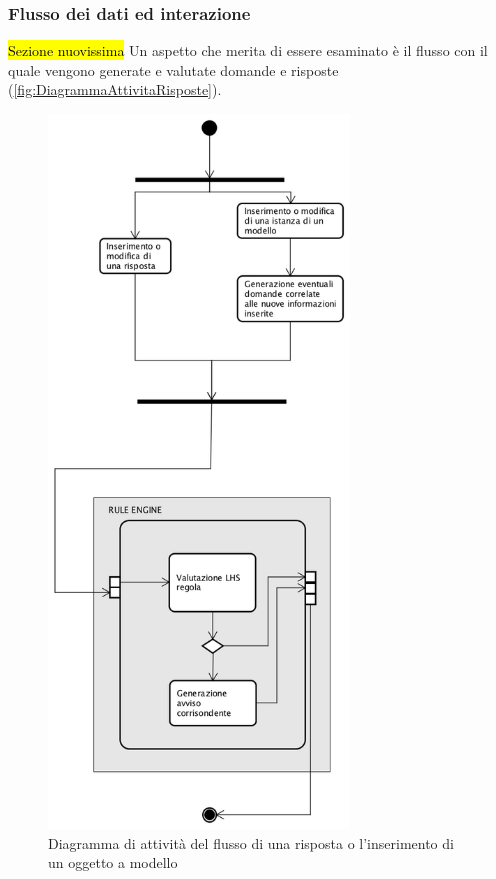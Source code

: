 \subsubsection{Flusso dei dati ed interazione}
\hl{Sezione nuovissima}
 Un aspetto che merita di essere esaminato è il flusso con il quale vengono generate e valutate domande e risposte  (\autoref{fig:DiagrammaAttivitaRisposte}).
\begin{figure}[H]
	\begin{center}
		\includegraphics[width=8cm]{Pics/diagramma_attivita_risposte.png}
		\caption{Diagramma di attività del flusso di una risposta o l'inserimento di un oggetto a modello}
		\label{fig:DiagrammaAttivitaRisposte}
	\end{center}
\end{figure}

